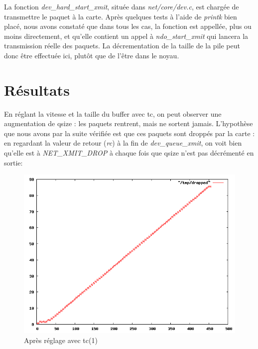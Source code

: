 \documentclass[a4paper]{article}
\begin{document}
La fonction \textit{dev\_hard\_start\_xmit}, située dans
\textit{net/core/dev.c}, est chargée de transmettre le paquet
à la carte. Après quelques tests à l'aide de \textit{printk} bien
placé, nous avons constaté que dans tous les cas, la fonction
est appellée, plus ou moins directement, et qu'elle contient 
un appel à \textit{ndo\_start\_xmit} qui lancera la transmission réelle des paquets. La décrementation de la
taille de la pile peut donc être effectuée ici, plutôt que de
l'être dans le noyau.

\section{Résultats}
En réglant la vitesse et la taille du buffer avec tc, on peut observer
une augmentation de qsize : les paquets rentrent, mais ne sortent jamais.
L'hypothèse que nous avons par la suite vérifiée est que ces paquets
sont droppés par la carte : en regardant la valeur de retour (\textit{rc}) à
la  fin de \textit{dev\_queue\_xmit}, on voit bien  qu'elle est à
\textit{NET\_XMIT\_DROP} à chaque fois que qsize n'est pas décrémenté
en sortie:
\begin{figure}[!ht]
	\centering
	\includegraphics[scale=.5]{dropped.png}
	\caption{\label{dropped} Après réglage avec tc(1)}
\end{figure}
\end{document}
